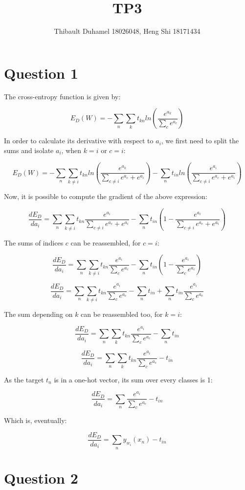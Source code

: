 \documentclass{article}
\title{TP3}
\author{Thibault Duhamel 18026048, Heng Shi 18171434 }
\begin{document}
\maketitle

\section*{Question 1}

The cross-entropy function is given by:

$$ E_D(W) = - \sum_n \sum_k t_{kn} ln(\frac{e^{a_k}}{\sum_c e^{a_c}})$$

In order to calculate its derivative with respect to $a_i$, we first need to split the sums and isolate $a_i$, when $k=i$ or $c=i$:

$$ E_D(W) = - \sum_n \sum_{k \neq i} t_{kn} ln(\frac{e^{a_k}}{\sum_{c \neq i} e^{a_c} + e^{a_i}}) - \sum_n t_{in} ln(\frac{e^{a_i}}{\sum_{c \neq i} e^{a_c} + e^{a_i}})$$

Now, it is possible to compute the gradient of the above expression:

$$ \frac{dE_D}{da_i} = \sum_n \sum_{k \neq i} t_{kn} \frac{e^{a_i}}{\sum_{c \neq i} e^{a_c} + e^{a_i}} - \sum_n t_{in} (1 - \frac{e^{a_i}}{\sum_{c \neq i} e^{a_c} + e^{a_i}})$$

The sums of indices $c$ can be reassembled, for $c=i$:

$$ \frac{dE_D}{da_i} = \sum_n \sum_{k \neq i} t_{kn} \frac{e^{a_i}}{\sum_c e^{a_c}} - \sum_n t_{in} (1 - \frac{e^{a_i}}{\sum_{c} e^{a_c}})$$

$$ \frac{dE_D}{da_i} = \sum_n \sum_{k \neq i} t_{kn} \frac{e^{a_i}}{\sum_c e^{a_c}} - \sum_n t_{in} + \sum_n { t_{in} \frac{e^{a_i}}{\sum_{c} e^{a_c}}}$$

The sum depending on $k$ can be reassembled too, for $k=i$:

$$ \frac{dE_D}{da_i} = \sum_n \sum_k t_{kn} \frac{e^{a_i}}{\sum_c e^{a_c}} - \sum_n t_{in}$$

$$ \frac{dE_D}{da_i} = \sum_n \sum_k t_{kn} \frac{e^{a_i}}{\sum_c e^{a_c}} - t_{in}$$

As the target $t_{n}$ is in a one-hot vector, its sum over every classes is 1:

$$ \frac{dE_D}{da_i} = \sum_n \frac{e^{a_i}}{\sum_c e^{a_c}} - t_{in}$$

Which is, eventually:

$$\boxed{ \frac{dE_D}{da_i} = \sum_n y_{w_i}(x_n) - t_{in} }$$

\section*{Question 2}
\end{document}
